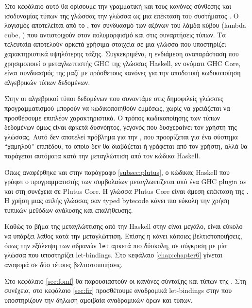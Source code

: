 Στο κεφάλαιο αυτό θα ορίσουμε την γραμματική και τους κανόνες σύνθεσης και
ισοδυναμίας τύπων της γλώσσας την γλώσσα \FIR{} ως μια επέκταση του συστήματος
\FOMF. Ο λογισμός \FOMF{} αποτελείται από το \FOM, τον συνδυασμό των αξόνων του
λάμδα κύβου (lambda cube, \cite{lambdacube}) που αντιστοιχούν στον πολυμορφισμό
και στις συναρτήσεις τύπων. Τα τελευταία αποτελούν αρκετά χρήσιμα στοιχεία σε
μια γλώσσα που υποστηρίζει χαρακτηριστικά υψηλότερης τάξης. Συγκεκριμένα, η
ενδιάμεση αναπαράσταση που χρησιμοποιεί ο μεταγλωττιστής GHC της γλώσσας
Haskell, εν ονόματι GHC Core, είναι συνδυασμός της \FOM{} μαζί με πρόσθετους
κανόνες για την αποδοτική κωδικοποίηση αλγεβρικών τύπων δεδομένων.

Στην \FOMF{} οι αλγεβρικοί τύποι δεδομένων που συναντάμε στις δημοφιλείς γλώσσες
προγραμματισμού μπορούν να κωδικοποιηθούν εμμέσως, χωρίς να χρειάζεται να
προσθέσουμε επιπλέον χαρακτηριστικά.  Ο τρόπος κωδικοποίησης των τύπων
δεδομένων όμως είναι αρκετά δυσνόητος, γεγονός που δυσχεραίνει τον χρήστη της
γλώσσας. Αυτό δεν αποτελεί πρόβλημα για την \FOMF, που προορίζεται για ένα
σύστημα ``χαμηλού'' επιπέδου, το οποίο δεν θα διαβάζεται ή γράφεται από τον
χρήστη, αλλά θα παράγεται αυτόματα κατά την μεταγλώττιση από τον κώδικα
Haskell.

Όπως αναφέρθηκε και στην παράγραφο \ref{subsec:plutus}, ο κώδικας Haskell που
γράφει ο προγραμματιστής των συμβολαίων μεταγλωττίζεται από ένα GHC plugin σε
\FIR{} και στη συνέχεια σε Plutus Core. Η γλώσσα Plutus Core είναι άμεση
επέκταση της \FOMF. Η χρήση μιας απλής γλώσσας σαν typed bytecode κάνει πιο
εύκολη την χρήση τυπικών μεθόδων ανάλυσης και επαλήθευσης.

Καθώς το βήμα της μεταγλώττισης από την Haskell στην \FOMF{} είναι μεγάλο,
είναι εύκολο να υπάρξει λάθος κατά την μεταγλώττιση. Επίσης η \FOMF{} κάνει
κάποιες βελτιστοποιήσεις, όπως την εξάλειψη των αδρανών \texttt{let} αρκετά πιο
δύσκολη, σε σύγκριση με μία γλώσσα που υποστηρίζει let-bindings. Στο κεφάλαιο
\ref{chap:chapter6} γίνεται αναφορά σε δύο τέτοιες βελτιστοποιήσεις.

Στο κεφάλαιο \ref{sec:fomf} θα παρουσιαστούν οι κανόνες σύνταξης και τύπων της
\FOMF. Στη συνέχεια, στο κεφάλαιο \ref{sec:fir}  προσθέτουμε αναδρομικά
let-bindings στην \FOMF{} που υποστηρίζουν την δήλωση αμοιβαία αναδρομικών όρων
και τύπων.
